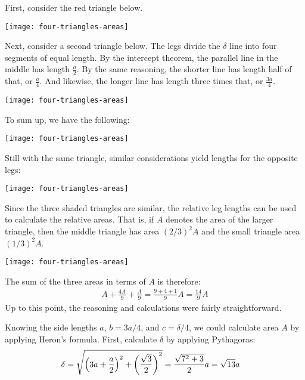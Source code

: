\documentclass[12pt]{article}
\begin{document}
\begin{answer}
First, consider the red triangle below. 
\begin{center}
\texttt{[image: four-triangles-areas]}
\end{center}

Next, consider a second triangle below. The legs divide the $\delta$ line into four segments of equal length. By the intercept theorem, the parallel line in the middle has length $\frac{a}{2}$. By the same reasoning, the shorter line has length half of that, or $\frac{a}{4}$. And likewise, the longer line has length three times that, or $\frac{3a}{4}$.
\begin{center}
\texttt{[image: four-triangles-areas]}
\end{center}

To sum up, we have the following:
\begin{center}
\texttt{[image: four-triangles-areas]}
\end{center}

Still with the same triangle, similar considerations yield lengths for the opposite legs:
\begin{center}
\texttt{[image: four-triangles-areas]}
\end{center}

Since the three shaded triangles are similar, the relative leg lengths can be used to calculate the relative areas. That is, if $A$ denotes the area of the larger triangle, then the middle triangle has area $(2/3)^2A$ and the small triangle area $(1/3)^2A$.
\begin{center}
\texttt{[image: four-triangles-areas]}
\end{center}
The sum of the three areas in terms of $A$ is therefore:
\begin{align*}
A + \frac{4A}{9} + \frac{A}{9}
 = \frac{9+4+1}{9} A
 = \frac{14}{9} A
\end{align*}
Up to this point, the reasoning and calculations were fairly straightforward.

Knowing the side lengths $a$, $b=3a/4$, and $c=\delta/4$, we could calculate area $A$ by applying Heron's formula. First, calculate $\delta$  by applying Pythagoras:
\begin{align*}
\delta 
  & = \sqrt{%
    \left(3a + \frac{a}{2}\right)^2 
  + \left(\frac{\sqrt{3}}{2}\right)^2 
  } 
  = \frac{\sqrt{7^2+3}}{2} a
  = \sqrt{13} a
\end{align*}


\end{answer}
\end{document}
